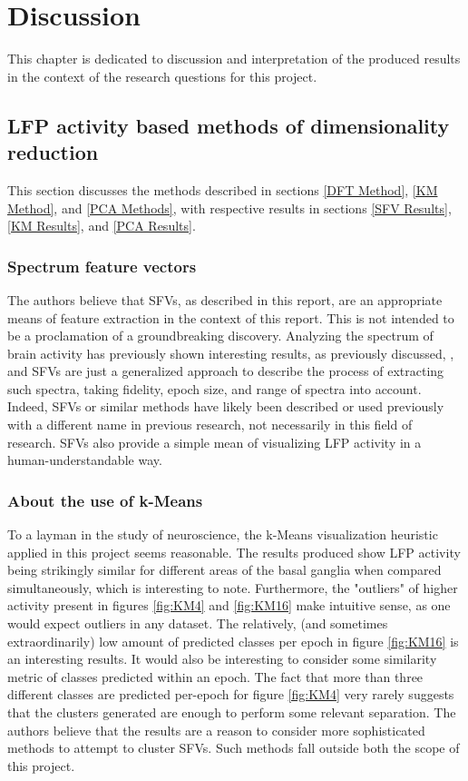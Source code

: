 \documentclass{kththesis}
\begin{document}
\newpage
\chapter{Discussion}

This chapter is dedicated to discussion and interpretation of the produced results in the context of the research questions for this project.

\section{LFP activity based methods of dimensionality reduction}

This section discusses the methods described in sections \ref{DFT Method}, \ref{KM Method}, and \ref{PCA Methods}, with respective results in sections \ref{SFV Results}, \ref{KM Results}, and \ref{PCA Results}.

\subsection{Spectrum feature vectors}

The authors believe that SFVs, as described in this report, are an appropriate means of feature extraction in the context of this report. 
This is not intended to be a proclamation of a groundbreaking discovery.
Analyzing the spectrum of brain activity has previously shown interesting results, as previously discussed, \parencite{Cagnan}, and SFVs are just a generalized approach to describe the process of extracting such spectra, taking fidelity, epoch size, and range of spectra into account.
Indeed, SFVs or similar methods have likely been described or used previously with a different name in previous research, not necessarily in this field of research.
SFVs also provide a simple mean of visualizing LFP activity in a human-understandable way.

\subsection{About the use of k-Means}

To a layman in the study of neuroscience, the k-Means visualization heuristic applied in this project seems reasonable.
The results produced show LFP activity being strikingly similar for different areas of the basal ganglia when compared simultaneously, which is interesting to note.
Furthermore, the "outliers" of higher activity present in figures \ref{fig:KM4} and \ref{fig:KM16} make intuitive sense, as one would expect outliers in any dataset.
The relatively, (and sometimes extraordinarily) low amount of predicted classes per epoch in figure \ref{fig:KM16} is an interesting results. 
It would also be interesting to consider some similarity metric of classes predicted within an epoch.
The fact that more than three different classes are predicted per-epoch for figure \ref{fig:KM4} very rarely suggests that the clusters generated are enough to perform some relevant separation.
The authors believe that the results are a reason to consider more sophisticated methods to attempt to cluster SFVs.
Such methods fall outside both the scope of this project.
\end{document}
